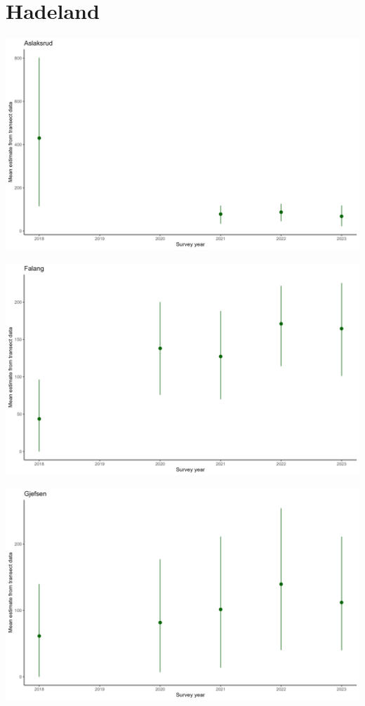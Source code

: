 \documentclass[
  letterpaper,
  DIV=11,
  numbers=noendperiod]{scrreport}
\begin{document}
\hypertarget{hadeland-3}{%
\section{Hadeland}\label{hadeland-3}}

\includegraphics{Figurer/trans_Est/Aslaksrud_plot.png}

\includegraphics{Figurer/trans_Est/Falang_plot.png}

\includegraphics{Figurer/trans_Est/Gjefsen_plot.png}
\end{document}

